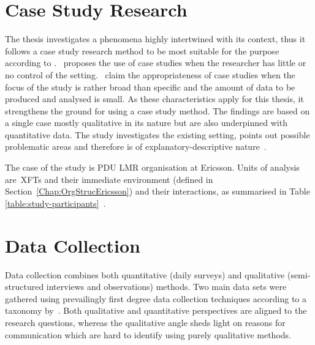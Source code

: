 \section{Case Study Research}

The thesis investigates a phenomena highly intertwined with its context, thus it follows a case study research method to be most suitable for the purpose according to \citet{runeson}.~\citet{yin2009case} proposes the use of case studies when the researcher has little or no control of the setting.~\citet{Lethbridge05studyingsoftware} claim the appropriateness of case studies when the focus of the study is rather broad than specific and the amount of data to be produced and analysed is small. As these characteristics apply for this thesis, it strengthens the ground for using a case study method.
The findings are based on a single case mostly qualitative in its nature but are also underpinned with quantitative data. The study investigates the existing setting, points out possible problematic areas and therefore is of explanatory-descriptive nature~\citep{runeson}.

The case of the study is PDU LMR organisation at Ericsson. Units of analysis are~\acp{XFT} and their immediate environment (defined in Section~\ref{Chap:OrgStrucEricsson}) and their interactions, as summarised in Table \ref{table:study-participants}~\citep{runeson}.

\section{Data Collection}

Data collection combines both quantitative (daily surveys) and qualitative (semi-structured interviews and observations) methods. Two main data sets were gathered using prevailingly first degree data collection techniques according to a taxonomy by~\citet{Lethbridge05studyingsoftware}. Both qualitative and quantitative perspectives are aligned to the research questions, whereas the qualitative angle sheds light on reasons for communication which are hard to identify using purely qualitative methods.


